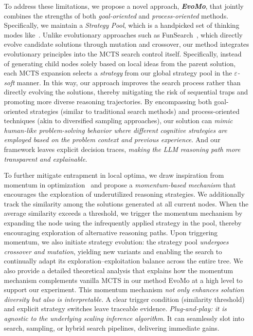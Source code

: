 \documentclass[11pt]{article}
\theoremstyle{definition}
\theoremstyle{remark}
\newcommand{\ourmethod}{{\fontfamily{lmtt}\selectfont EvoMo}\xspace}
\begin{document}
To address these limitations, we propose a novel approach, \textbf{\textit{EvoMo}}, that jointly combines the strengths of both \textit{goal-oriented} and \textit{process-oriented} methods. Specifically, we maintain a \textit{Strategy Pool}, which is a handpicked set of thinking modes like~\citep{wang2025diversified, chen2024reverse}. Unlike evolutionary approaches such as FunSearch~\citep{FunSearch2023}, which directly evolve candidate solutions through mutation and crossover, our method integrates evolutionary principles into the MCTS search control itself. Specifically, instead of generating child nodes solely based on local ideas from the parent solution, each MCTS expansion selects a \textit{strategy} from our global strategy pool in the \textit{$\varepsilon$-soft} manner. In this way, our approach improves the search process rather than directly evolving the solutions, thereby mitigating the risk of sequential traps and promoting more diverse reasoning trajectories. By encompassing both goal-oriented strategies (similar to traditional search methods) and process-oriented techniques (akin to diversified sampling approaches), our solution can  \textit{mimic human-like problem-solving behavior where different cognitive strategies are employed based on the problem context and previous experience}. And our framework leaves explicit decision traces,  \textit{making the LLM reasoning path more transparent and explainable}.




To further mitigate entrapment in local optima, we draw inspiration from momentum in optimization~\citep{sutskever2013importance} and propose a \textit{momentum-based mechanism} that encourages the exploration of underutilized reasoning strategies. We additionally track the similarity among the solutions generated at all current nodes. When the average similarity exceeds a threshold, we trigger the momentum mechanism by expanding the node using the infrequently applied strategy in the pool, thereby encouraging exploration of alternative reasoning paths. Upon triggering momentum, we also initiate strategy evolution: the strategy pool \textit{undergoes crossover and mutation}, yielding new variants and enabling the search to continually adapt its exploration–exploitation balance across the entire tree. We also provide a detailed theoretical analysis 
that explains how the momentum mechanism complements vanilla MCTS in our method \ourmethod at a high level to support our experiment. This momentum mechanism  \textit{not only enhances solution diversity but also is interpretable.} A clear trigger condition (similarity threshold) and explicit strategy switches leave traceable evidence.  \textit{Plug-and-play: it is agnostic to the underlying scaling inference algorithm}. It can seamlessly slot into search, sampling, or hybrid search pipelines, delivering immediate gains. 
\end{document}
